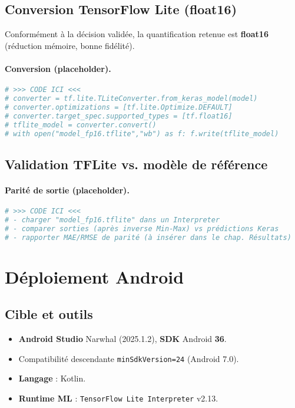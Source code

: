 \subsection{Conversion TensorFlow Lite (float16)}
Conformément à la décision validée, la quantification retenue est \textbf{float16} (réduction mémoire, bonne fidélité). 

\paragraph{Conversion (placeholder).}
\begin{lstlisting}[language=Python,caption={(Placeholder) Conversion TFLite en float16},label={lst:tflite_fp16}]
# >>> CODE ICI <<<
# converter = tf.lite.TLiteConverter.from_keras_model(model)
# converter.optimizations = [tf.lite.Optimize.DEFAULT]
# converter.target_spec.supported_types = [tf.float16]
# tflite_model = converter.convert()
# with open("model_fp16.tflite","wb") as f: f.write(tflite_model)
\end{lstlisting}

\subsection{Validation TFLite vs. modèle de référence}
\paragraph{Parité de sortie (placeholder).}
\begin{lstlisting}[language=Python,caption={(Placeholder) Test de parité Keras vs TFLite sur N échantillons},label={lst:parity}]
# >>> CODE ICI <<<
# - charger "model_fp16.tflite" dans un Interpreter
# - comparer sorties (après inverse Min-Max) vs prédictions Keras
# - rapporter MAE/RMSE de parité (à insérer dans le chap. Résultats)
\end{lstlisting}

\section{Déploiement Android}
\label{sec:deploiement_android}

\subsection{Cible et outils}
\begin{itemize}
    \item \textbf{Android Studio} Narwhal (2025.1.2), \textbf{SDK} Android \textbf{36}.
    \item Compatibilité descendante \texttt{minSdkVersion=24} (Android 7.0).
    \item \textbf{Langage} : Kotlin.
    \item \textbf{Runtime ML} : \texttt{TensorFlow Lite Interpreter} v2.13.
\end{itemize}

